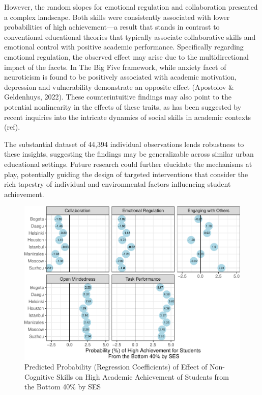 \documentclass{article}
\begin{document}
However, the random slopes for emotional regulation and collaboration
presented a complex landscape. Both skills were consistently associated
with lower probabilities of high achievement---a result that stands in
contrast to conventional educational theories that typically associate
collaborative skills and emotional control with positive academic
performance. Specifically regarding emotional regulation, the observed
effect may arise due to the multidirectional impact of the facets. In
The Big Five framework, while anxiety facet of neuroticism is found to
be positively associated with academic motivation, depression and
vulnerability demonstrate an opposite effect (Apostolov \& Geldenhuys,
2022). These counterintuitive findings may also point to the potential
nonlinearity in the effects of these traits, as has been suggested by
recent inquiries into the intricate dynamics of social skills in
academic contexts (ref).

The substantial dataset of 44,394 individual observations lends
robustness to these insights, suggesting the findings may be
generalizable across similar urban educational settings. Future research
could further elucidate the mechanisms at play, potentially guiding the
design of targeted interventions that consider the rich tapestry of
individual and environmental factors influencing student achievement.

\begin{figure}
\centering
\includegraphics{working_paper_files/figure-latex/mlm master chart-1.pdf}
\caption{Predicted Probability (Regression Coefficients) of Effect of
Non-Cognitive Skills on High Academic Achievement of Students from the
Bottom 40\% by SES}
\end{figure}
\end{document}
